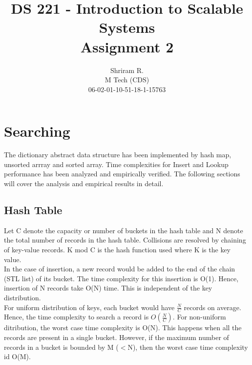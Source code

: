 \documentclass[11pt,a4paper,oneside]{article}
\begin{document}
	\title{DS 221 - Introduction to Scalable Systems \\ Assignment 2}
	\author{Shriram R. \\ M Tech (CDS) \\ 06-02-01-10-51-18-1-15763}
	\maketitle
	
	\section{Searching}
	The dictionary abstract data structure has been implemented by hash map, unsorted arrray and sorted array. Time complexities for Insert and Lookup performance has been analyzed and empirically verified. The following sections will cover the analysis and empirical results in detail.
	
	\subsection{Hash Table}
	Let C denote the capacity or number of buckets in the hash table and N denote the total number of records in the hash table. Collisions are resolved by chaining of key-value records. K mod C is the hash function used where K is the key value.\\
	\newline
	In the case of insertion, a new record would be added to the end of the chain (STL list) of its bucket. The time complexity for this insertion is O(1). Hence, insertion of N records take O(N) time. This is independent of the key distribution. \\
	\newline
	For uniform distribution of keys, each bucket would have $\frac{N}{C}$ records on average. Hence, the time complexity to search a record is $O(\frac{N}{C})$. For non-uniform ditribution, the worst case time complexity is O(N). This happens when all the records are present in a single bucket. However, if the maximum number of records in a bucket is bounded by M ($<$N), then the worst case time complexity id O(M).
	
\end{document}
